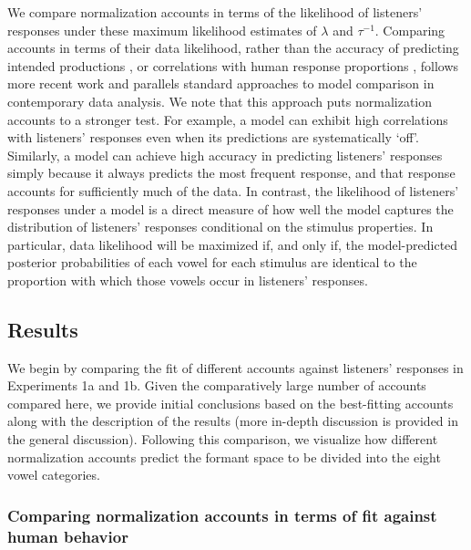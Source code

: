 \documentclass[preprint]{JASA}
\begin{document}
We compare normalization accounts in terms of the likelihood of listeners' responses under these maximum likelihood estimates of \(\lambda\) and \(\tau^{-1}\). Comparing accounts in terms of their data likelihood, rather than the accuracy of predicting intended productions \citep[e.g.,][]{johnson2020, persson-jaeger2023}, or correlations with human response proportions \citep[e.g.,][]{nearey-assmann1986, hillenbrand-nearey1999}, follows more recent work \citep[e.g.,][]{barreda2021, mcmurray-jongman2011, richter2017, xie2023} and parallels standard approaches to model comparison in contemporary data analysis. We note that this approach puts normalization accounts to a stronger test. For example, a model can exhibit high correlations with listeners' responses even when its predictions are systematically `off'. Similarly, a model can achieve high accuracy in predicting listeners' responses simply because it always predicts the most frequent response, and that response accounts for sufficiently much of the data. In contrast, the likelihood of listeners' responses under a model is a direct measure of how well the model captures the distribution of listeners' responses conditional on the stimulus properties. In particular, data likelihood will be maximized if, and only if, the model-predicted posterior probabilities of each vowel for each stimulus are identical to the proportion with which those vowels occur in listeners' responses.

\subsection{Results}\label{results}

We begin by comparing the fit of different accounts against listeners' responses in Experiments 1a and 1b. Given the comparatively large number of accounts compared here, we provide initial conclusions based on the best-fitting accounts along with the description of the results (more in-depth discussion is provided in the general discussion). Following this comparison, we visualize how different normalization accounts predict the formant space to be divided into the eight vowel categories.

\subsubsection{Comparing normalization accounts in terms of fit against human behavior}\label{comparing-normalization-accounts-in-terms-of-fit-against-human-behavior}
\end{document}
